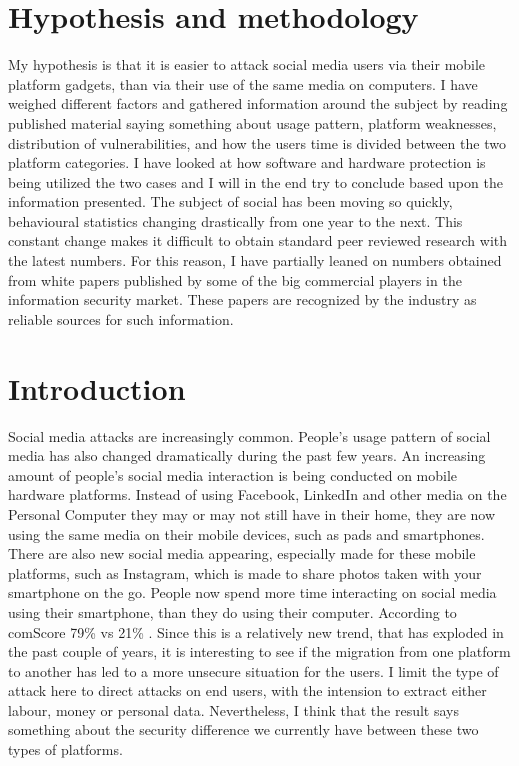 \section{Hypothesis and methodology}
My hypothesis is that it is easier to attack social media users via their mobile platform gadgets, than via their use of the same media on computers. I have weighed different factors and gathered information around the subject by reading published material saying something about usage pattern, platform weaknesses, distribution of vulnerabilities, and how the users time is divided between the two platform categories. I have looked at how software and hardware protection is being utilized the two cases and I will in the end try to conclude based upon the information presented.
 The subject of social has been moving so quickly, behavioural statistics changing drastically from one year to the next. This constant change makes it difficult to obtain standard peer reviewed research with the latest numbers. For this reason, I have partially leaned on numbers obtained from white papers published by some of the big commercial players in the information security market. These papers are recognized by the industry as reliable sources for such information.
\section{Introduction}
Social media attacks are increasingly common. People’s usage pattern of social media has also changed dramatically during the past few years. An increasing amount of people’s social media interaction is being conducted on mobile hardware platforms. Instead of using Facebook, LinkedIn and other media on the Personal Computer they may or may not still have in their home, they are now using the same media on their mobile devices, such as pads and smartphones. There are also new social media appearing, especially made for these mobile platforms, such as Instagram, which is made to share photos taken with your smartphone on the go.
People now spend more time interacting on social media using their smartphone, than they do using their computer. According to comScore 79\% vs 21\% \cite{CrossPlatform2016}. Since this is a relatively new trend, that has exploded in the past couple of years, it is interesting to see if the migration from one platform to another has led to a more unsecure situation for the users. I limit the type of attack here to direct attacks on end users, with the intension to extract either labour, money or personal data. Nevertheless, I think that the result says something about the security difference we currently have between these two types of platforms.
